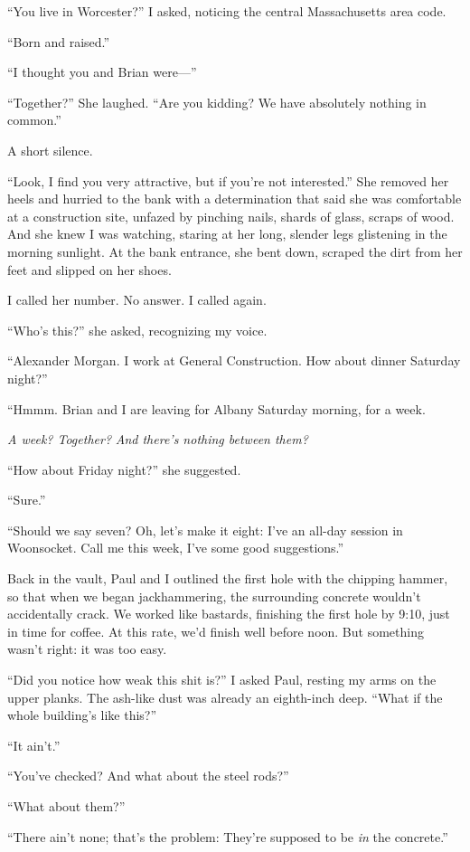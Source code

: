 ``You live in Worcester?'' I asked, noticing the central Massachusetts
area code.

``Born and raised.''

``I thought you and Brian were---''

``Together?'' She laughed. ``Are you kidding? We have absolutely nothing
in common.''

A short silence.

``Look, I find you very attractive, but if you're not interested.'' She
removed her heels and hurried to the bank with a determination that said
she was comfortable at a construction site, unfazed by pinching nails,
shards of glass, scraps of wood. And she knew I was watching, staring at
her long, slender legs glistening in the morning sunlight. At the bank
entrance, she bent down, scraped the dirt from her feet and slipped on
her shoes.

I called her number. No answer. I called again.

``Who's this?'' she asked, recognizing my voice.

``Alexander Morgan. I work at General Construction. How about dinner
Saturday night?''

``Hmmm. Brian and I are leaving for Albany Saturday morning, for a week.

\emph{A week? Together?} \emph{And there's nothing between them?}

``How about Friday night?'' she suggested.

``Sure.''

``Should we say seven? Oh, let's make it eight: I've an all-day session
in Woonsocket. Call me this week, I've some good suggestions.''

Back in the vault, Paul and I outlined the first hole with the chipping
hammer, so that when we began jackhammering, the surrounding concrete
wouldn't accidentally crack. We worked like bastards, finishing the
first hole by 9:10, just in time for coffee. At this rate, we'd finish
well before noon. But something wasn't right: it was too easy.

``Did you notice how weak this shit is?'' I asked Paul, resting my arms
on the upper planks. The ash-like dust was already an eighth-inch deep.
``What if the whole building's like this?''

``It ain't.''

``You've checked? And what about the steel rods?''

``What about them?''

``There ain't none; that's the problem: They're supposed to be \emph{in}
the concrete.''

